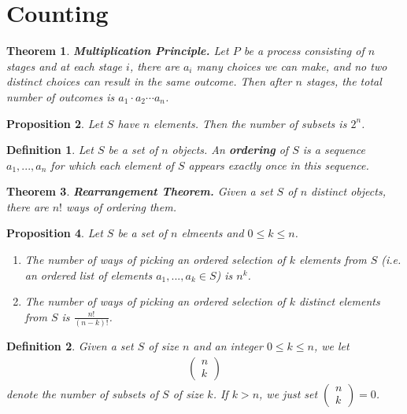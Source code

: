 \documentclass{article}
\theoremstyle{sltheorem}
\newtheorem{definition}{Definition}[section]
\newtheorem{theorem}{Theorem}[section]
\newtheorem{proposition}[theorem]{Proposition}
\begin{document}
\section{Counting}
\begin{theorem}
    \textbf{Multiplication Principle.} Let $P$ be a process consisting of $n$ stages and at each stage $i$, there are $a_i$ many choices we can make, and no two distinct choices can result in the same outcome. 
    Then after $n$ stages, the total number of outcomes is $a_1\cdot a_2\cdots a_n$.
\end{theorem}
\begin{proposition}
    Let $S$ have $n$ elements. Then the number of subsets is $2^n$.    
\end{proposition}
\begin{definition}
    Let $S$ be a set of $n$ objects. An \textbf{ordering} of $S$ is a sequence $a_1,...,a_n$ for which each element of $S$ appears exactly once in this sequence.
\end{definition}
\begin{theorem}
    \textbf{Rearrangement Theorem.} Given a set $S$ of $n$ distinct objects, there are $n!$ ways of ordering them.
\end{theorem}
\begin{proposition}
    Let $S$ be a set of $n$ elmeents and $0\leq k \leq n$.    
    \begin{enumerate}
        \item The number of ways of picking an ordered selection of $k$ elements from $S$ (i.e. an ordered list of elements $a_1, ..., a_k\in S$) is $n^k$.
        \item The number of ways of picking an ordered selection of $k$ distinct elements from $S$ is $\frac{n!}{(n-k)!}$.
    \end{enumerate}
\end{proposition}
\begin{definition}
    Given a set $S$ of size $n$ and an integer $0\leq k \leq n$, we let
    \begin{align*}
        \begin{pmatrix}
            n\\k
        \end{pmatrix}
    \end{align*}
    denote the number of subsets of $S$ of size $k$. If $k>n$, we just set $\begin{pmatrix}
        n\\k
    \end{pmatrix}=0$.
\end{definition}
\end{document}
